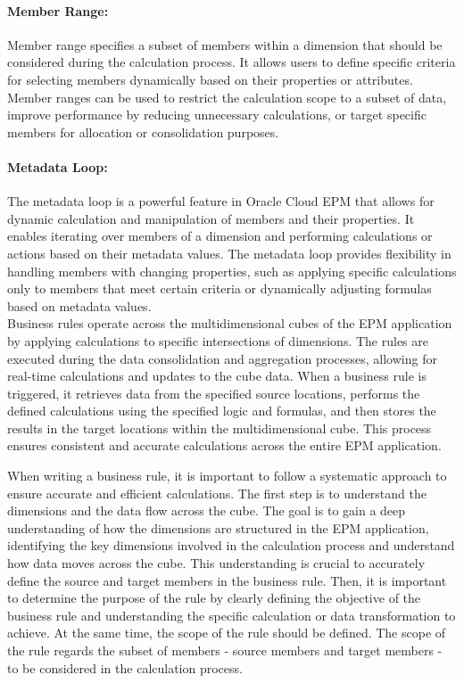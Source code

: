 \documentclass[12pt,a4paper,openright,twoside]{book}
\begin{document}
\paragraph{Member Range:}
Member range specifies a subset of members within a dimension that should be considered during the calculation process. 
%
It allows users to define specific criteria for selecting members dynamically based on their properties or attributes. 
%
Member ranges can be used to restrict the calculation scope to a subset of data, improve performance by reducing unnecessary calculations, or target specific members for allocation or consolidation purposes.

\paragraph{Metadata Loop:}
The metadata loop is a powerful feature in Oracle Cloud EPM that allows for dynamic calculation and manipulation of members and their properties. 
%
It enables iterating over members of a dimension and performing calculations or actions based on their metadata values. 
%
The metadata loop provides flexibility in handling members with changing properties, such as applying specific calculations only to members that meet certain criteria or dynamically adjusting formulas based on metadata values. \\

Business rules operate across the multidimensional cubes of the EPM application by applying calculations to specific intersections of dimensions. 
%
The rules are executed during the data consolidation and aggregation processes, allowing for real-time calculations and updates to the cube data.
%
When a business rule is triggered, it retrieves data from the specified source locations, performs the defined calculations using the specified logic and formulas, and then stores the results in the target locations within the multidimensional cube. 
%
This process ensures consistent and accurate calculations across the entire EPM application.

When writing a business rule, it is important to follow a systematic approach to ensure accurate and efficient calculations.
%
The first step is to understand the dimensions and the data flow across the cube.
%
The goal is to gain a deep understanding of how the dimensions are structured in the EPM application, identifying the key dimensions involved in the calculation process and understand how data moves across the cube.
%
This understanding is crucial to accurately define the source and target members in the business rule.
%
Then, it is important to determine the purpose of the rule by clearly defining the objective of the business rule and understanding the specific calculation or data transformation to achieve.
%
At the same time, the scope of the rule should be defined.
%
The scope of the rule regards the subset of members - source members and target members - to be considered in the calculation process. 
\end{document}
